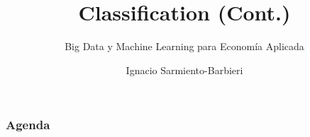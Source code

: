 \documentclass[
  shownotes,
  xcolor={svgnames},
  hyperref={colorlinks,citecolor=DarkBlue,linkcolor=andesred,urlcolor=DarkBlue}
  , aspectratio=169]{beamer}
\begin{document}
\title{Classification (Cont.)}
\subtitle{Big Data y Machine Learning para Economía Aplicada}
\date{}

\author[Sarmiento-Barbieri]{Ignacio Sarmiento-Barbieri}


\begin{frame}[noframenumbering]
\maketitle
\end{frame}







\begin{frame}
\frametitle{Agenda}

\tableofcontents

\end{frame}



\end{document}
